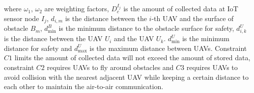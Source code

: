 \documentclass[conference]{IEEEtran}
\begin{document}
where $\omega_1$, $\omega_2$ are weighting factors, $D^{I_j}_{c}$ is the amount of collected data at IoT sensor node $I_j$, $d_{i,m}$ is the distance between the $i$-th UAV and the surface of obstacle $B_m$, $d_{\min}^{B}$ is the minimum distance to the obstacle surface for safety, $d^{U}_{i,k}$ is the distance between the UAV $U_i$ and the UAV $U_k$. $d^{U}_{\min}$ is the minimum distance for safety and $d^{U}_{\max}$ is the maximum distance between UAVs. Constraint $C1$ limits the amount of collected data will not exceed the amount of stored data, constraint $C2$ requires UAVs to fly around obstacles and $C3$ requires UAVs to avoid collision with the nearest adjacent UAV while keeping a certain distance to each other to maintain the air-to-air communication. 
\end{document}
